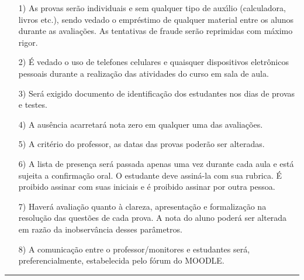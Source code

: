 \documentclass[12pt]{article}
\begin{document}

\begin{itemize}
\item[1)] As provas ser\~{a}o individuais e sem qualquer tipo de
aux\'{\i}lio (calculadora, livros etc.), sendo vedado o empr\'{e}stimo de
qualquer material entre os alunos durante as avalia\c{c}\~{o}es. As
tentativas de fraude ser\~{a}o reprimidas com m\'{a}ximo rigor.
\vspace{-0.25cm}

\item[2)] \'{E} vedado o uso de telefones celulares e quaisquer dispositivos eletr\^{o}nicos pessoais durante a realiza\c{c}\~{a}o das atividades do curso em sala de aula. \vspace{-0.25cm}

\item[3)] Ser\'{a} exigido documento de identifica\c{c}\~{a}o dos estudantes nos
dias de provas e testes. \vspace{-0.25cm}

\item[4)] A aus\^{e}ncia acarretar\'{a} nota zero em qualquer uma das
avalia\c{c}\~{o}es. \vspace{-0.25cm}

\item[5)] A crit\'{e}rio do professor, as datas das provas poder\~{a}o
ser alteradas. \vspace{-0.25cm}

\item[6)] A lista de presen\c{c}a ser\'{a} passada apenas uma vez
durante cada aula e est\'{a} sujeita a confirma\c{c}\~{a}o oral. O
estudante deve assin\'{a}-la com sua rubrica. {\'E} proibido assinar
com suas iniciais e \'{e} proibido assinar por outra pessoa.
\vspace{-0.25cm}

\item[7)] Haver{\'a} avalia{\c c}{\~a}o quanto {\`a} clareza, apresenta{\c
c}{\~a}o e formaliza{\c c}{\~a}o na  resolu{\c c}{\~a}o das quest{\~o}es de
cada prova. A nota do aluno poder{\'a} ser alterada em raz{\~a}o da
inobserv{\^a}ncia desses par{\^a}metros.

\item[8)] A comunica\c{c}\~ao entre o professor/monitores e estudantes ser\'a, preferencialmente,
 estabelecida pelo f\'orum do MOODLE.
\end{itemize}

\vfill
\hrule
\end{document}
